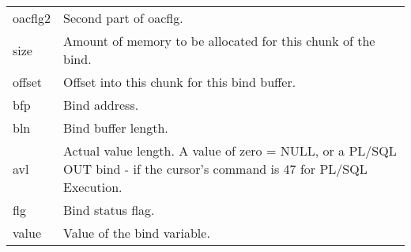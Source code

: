 \begin{longtable}[]{@{}l|l@{}}
\begin{minipage}[t]{0.14\columnwidth}\raggedright\strut
oacflg2\strut
\end{minipage} & \begin{minipage}[t]{0.65\columnwidth}\raggedright\strut
Second part of oacflg.\strut
\end{minipage}\tabularnewline
\begin{minipage}[t]{0.14\columnwidth}\raggedright\strut
size\strut
\end{minipage} & \begin{minipage}[t]{0.65\columnwidth}\raggedright\strut
Amount of memory to be allocated for this chunk of the bind.\strut
\end{minipage}\tabularnewline
\begin{minipage}[t]{0.14\columnwidth}\raggedright\strut
offset\strut
\end{minipage} & \begin{minipage}[t]{0.65\columnwidth}\raggedright\strut
Offset into this chunk for this bind buffer.\strut
\end{minipage}\tabularnewline
\begin{minipage}[t]{0.14\columnwidth}\raggedright\strut
bfp\strut
\end{minipage} & \begin{minipage}[t]{0.65\columnwidth}\raggedright\strut
Bind address.\strut
\end{minipage}\tabularnewline
\begin{minipage}[t]{0.14\columnwidth}\raggedright\strut
bln\strut
\end{minipage} & \begin{minipage}[t]{0.65\columnwidth}\raggedright\strut
Bind buffer length.\strut
\end{minipage}\tabularnewline
\begin{minipage}[t]{0.14\columnwidth}\raggedright\strut
avl\strut
\end{minipage} & \begin{minipage}[t]{0.65\columnwidth}\raggedright\strut
Actual value length. A value of zero = NULL, or a PL/SQL OUT bind - if
the cursor's command is 47 for PL/SQL Execution.\strut
\end{minipage}\tabularnewline
\begin{minipage}[t]{0.14\columnwidth}\raggedright\strut
flg\strut
\end{minipage} & \begin{minipage}[t]{0.65\columnwidth}\raggedright\strut
Bind status flag.\strut
\end{minipage}\tabularnewline
\begin{minipage}[t]{0.14\columnwidth}\raggedright\strut
value\strut
\end{minipage} & \begin{minipage}[t]{0.65\columnwidth}\raggedright\strut
Value of the bind variable.\strut
\end{minipage}\tabularnewline
\bottomrule
\end{longtable}

